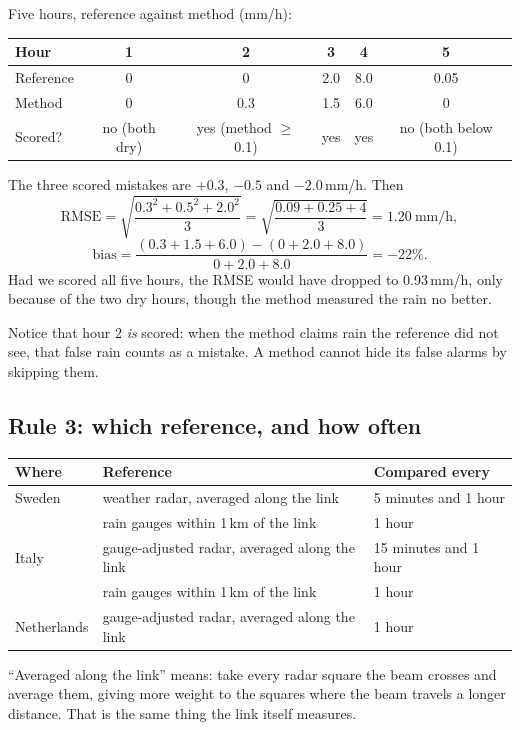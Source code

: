 \begin{example}
Five hours, reference against method (mm/h):
\begin{center}\small
\begin{tabular}{lccccc}
\toprule
Hour & 1 & 2 & 3 & 4 & 5\\
\midrule
Reference & 0 & 0 & 2.0 & 8.0 & 0.05\\
Method & 0 & 0.3 & 1.5 & 6.0 & 0\\
\midrule
Scored? & no (both dry) & yes (method $\geq$ 0.1) & yes & yes & no (both below 0.1)\\
\bottomrule
\end{tabular}
\end{center}
The three scored mistakes are $+0.3$, $-0.5$ and $-2.0$\,mm/h. Then
\[
\text{RMSE} = \sqrt{\frac{0.3^2 + 0.5^2 + 2.0^2}{3}} = \sqrt{\frac{0.09+0.25+4}{3}} = 1.20\ \text{mm/h},
\]
\[
\text{bias} = \frac{(0.3+1.5+6.0)-(0+2.0+8.0)}{0+2.0+8.0} = -22\%.
\]
Had we scored all five hours, the RMSE would have dropped to 0.93\,mm/h, only because of the two dry hours, though the
method measured the rain no better.
\end{example}

Notice that hour 2 \emph{is} scored: when the method claims rain the reference did not see, that false rain counts as a
mistake. A method cannot hide its false alarms by skipping them.

\subsection{Rule 3: which reference, and how often}
\begin{center}\small
\begin{tabular}{p{2.3cm}p{7.4cm}p{3.9cm}}
\toprule
Where & Reference & Compared every\\
\midrule
Sweden & weather radar, averaged along the link & 5 minutes and 1 hour\\
       & rain gauges within 1\,km of the link & 1 hour\\
Italy & gauge-adjusted radar, averaged along the link & 15 minutes and 1 hour\\
      & rain gauges within 1\,km of the link & 1 hour\\
Netherlands & gauge-adjusted radar, averaged along the link & 1 hour\\
\bottomrule
\end{tabular}
\end{center}
``Averaged along the link'' means: take every radar square the beam crosses and average them, giving more weight to the
squares where the beam travels a longer distance. That is the same thing the link itself measures.

